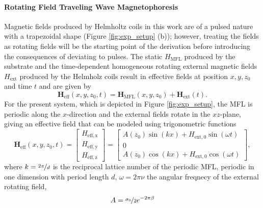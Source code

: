 \paragraph{Rotating Field Traveling Wave Magnetophoresis} 
Magnetic fields produced by Helmholtz coils in this work are of a pulsed nature with a trapezoidal shape (Figure \ref{fig:exp_setup} (b)); however, treating the fields as rotating fields will be the starting point of the derivation before introducing the consequences of deviating to pulses.
The static $H_\mathrm{MFL}$ produced by the substrate and the time-dependent homogeneous rotating external magnetic fields $H_\mathrm{ext}$ produced by the Helmholz coils result in effective fields at position $x,y,z_0$ and time $t$ and are given by \cite{Ehresmann2026}
\begin{equation}
    \mathbf{H}_\mathrm{eff}(x,y,z_0,t) = \mathbf{H}_\mathrm{MFL}(x,y,z_0) + \mathbf{H}_\mathrm{ext}(t).
\end{equation}
For the present system, which is depicted in Figure \ref{fig:exp_setup}, the \ac{MFL} is periodic along the $x$-direction and the external fields rotate in the $xz$-plane, giving an effective field that can be modeled using trigonometric functions \cite{Yellen2007, Ehresmann2026} 
\begin{equation}\label{eq:H_eff_approximation_yellen}
    \mathbf{H}_\mathrm{eff}(x,y,z_0,t) = \begin{bmatrix} 
                        H_\mathrm{eff,x}  \\ 
                        H_\mathrm{eff,y} \\
                        H_\mathrm{eff,z}
                    \end{bmatrix} = 
                    \begin{bmatrix} 
                        A(z_0)\sin(kx) +H_\mathrm{ext,0} \sin(\omega t) \\ 
                        0 \\
                        A(z_0)\cos(kx) +H_\mathrm{ext,0} \cos(\omega t)  
                    \end{bmatrix},
\end{equation}
where $k = \nicefrac{2\pi}{d}$ is the reciprocal lattice number of the periodic \ac{MFL}, periodic in one dimension with period length $d$, $\omega=2\pi\nu$ the angular freqnecy of the external rotating field, 
\begin{equation}\label{Eq:heuristic_A}    
A=\nicefrac{\sigma_0}{2}e^{-2\pi \beta}
\end{equation}
